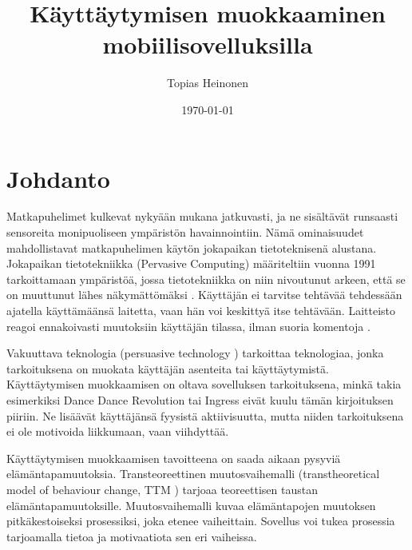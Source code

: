 \documentclass[finnish]{tktltiki2}
\title{Käyttäytymisen muokkaaminen mobiilisovelluksilla}
\author{Topias Heinonen}
\date{\today}
\theoremstyle{definition}
\theoremstyle{remark}
\begin{document}

\frontmatter      %

\maketitle        %
\makeabstract     %

\tableofcontents  %


\mainmatter       %

\section{Johdanto}


Matkapuhelimet kulkevat nykyään mukana jatkuvasti, ja ne sisältävät runsaasti sensoreita monipuoliseen ympäristön havainnointiin.
Nämä ominaisuudet mahdollistavat matkapuhelimen käytön jokapaikan tietoteknisenä alustana. 
Jokapaikan tietotekniikka (Pervasive Computing) määriteltiin vuonna 1991 tarkoittamaan ympäristöä, jossa tietotekniikka on niin nivoutunut arkeen, että se on muuttunut lähes näkymättömäksi \cite{weiser}.
Käyttäjän ei tarvitse tehtävää tehdessään ajatella käyttämäänsä laitetta, vaan hän voi keskittyä itse tehtävään.
Laitteisto reagoi ennakoivasti muutoksiin käyttäjän tilassa, ilman suoria komentoja \cite{pervasive}.

Vakuuttava teknologia (persuasive technology \cite{fogg1998}) tarkoittaa teknologiaa, jonka tarkoituksena on muokata käyttäjän asenteita tai käyttäytymistä.
Käyttäytymisen muokkaamisen on oltava sovelluksen tarkoituksena, minkä takia esimerkiksi Dance Dance Revolution tai Ingress eivät kuulu tämän kirjoituksen piiriin.
Ne lisäävät käyttäjänsä fyysistä aktiivisuutta, mutta niiden tarkoituksena ei ole motivoida liikkumaan, vaan viihdyttää.

Käyttäytymisen muokkaamisen tavoitteena on saada aikaan pysyviä elämäntapamuutoksia.
Transteoreettinen muutosvaihemalli (transtheoretical model of behaviour change, TTM \cite{ttm}) tarjoaa teoreettisen taustan elämäntapamuutoksille.
Muutosvaihemalli kuvaa elämäntapojen muutoksen pitkäkestoiseksi prosessiksi, joka etenee vaiheittain.
Sovellus voi tukea prosessia tarjoamalla tietoa ja motivaatiota sen eri vaiheissa.
\end{document}
